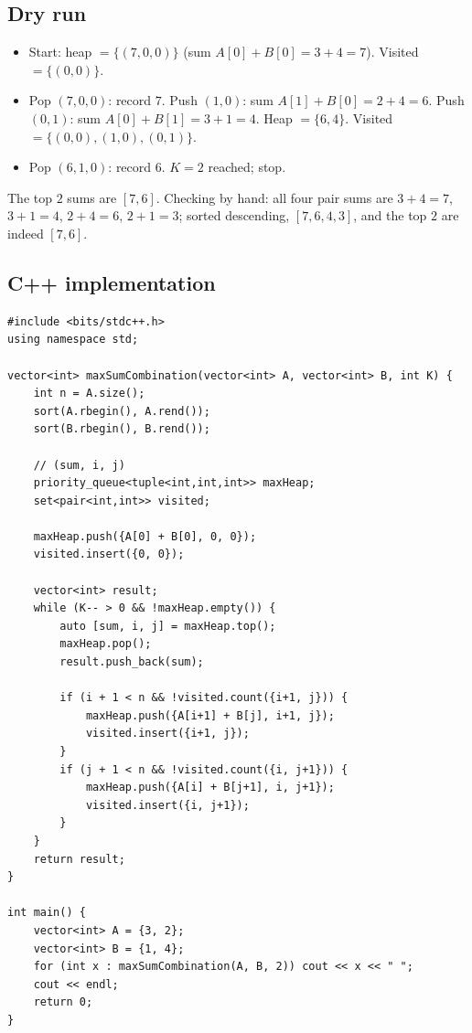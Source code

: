 \subsection*{Dry run}


\begin{itemize}
  \item Start: heap $=\{(7,0,0)\}$ (sum $A[0]+B[0]=3+4=7$). Visited
        $=\{(0,0)\}$.
  \item Pop $(7,0,0)$: record $7$. Push $(1,0)$: sum
        $A[1]+B[0]=2+4=6$. Push $(0,1)$: sum $A[0]+B[1]=3+1=4$. Heap
        $=\{6,4\}$. Visited $=\{(0,0),(1,0),(0,1)\}$.
  \item Pop $(6,1,0)$: record $6$. $K=2$ reached; stop.
\end{itemize}

The top $2$ sums are $[7,6]$. Checking by hand: all four pair sums are
$3{+}4=7$, $3{+}1=4$, $2{+}4=6$, $2{+}1=3$; sorted descending,
$[7,6,4,3]$, and the top $2$ are indeed $[7,6]$.

\subsection*{C++ implementation}

\begin{lstlisting}
#include <bits/stdc++.h>
using namespace std;

vector<int> maxSumCombination(vector<int> A, vector<int> B, int K) {
    int n = A.size();
    sort(A.rbegin(), A.rend());
    sort(B.rbegin(), B.rend());

    // (sum, i, j)
    priority_queue<tuple<int,int,int>> maxHeap;
    set<pair<int,int>> visited;

    maxHeap.push({A[0] + B[0], 0, 0});
    visited.insert({0, 0});

    vector<int> result;
    while (K-- > 0 && !maxHeap.empty()) {
        auto [sum, i, j] = maxHeap.top();
        maxHeap.pop();
        result.push_back(sum);

        if (i + 1 < n && !visited.count({i+1, j})) {
            maxHeap.push({A[i+1] + B[j], i+1, j});
            visited.insert({i+1, j});
        }
        if (j + 1 < n && !visited.count({i, j+1})) {
            maxHeap.push({A[i] + B[j+1], i, j+1});
            visited.insert({i, j+1});
        }
    }
    return result;
}

int main() {
    vector<int> A = {3, 2};
    vector<int> B = {1, 4};
    for (int x : maxSumCombination(A, B, 2)) cout << x << " ";
    cout << endl;
    return 0;
}
\end{lstlisting}

